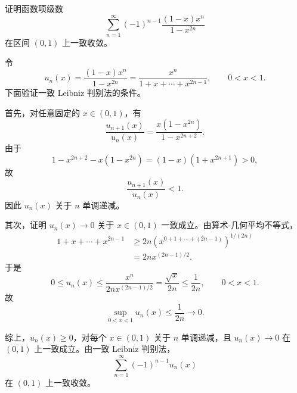 \begin{question}[15分]
证明函数项级数
\[
  \sum_{n=1}^{\infty}(-1)^{n-1}\frac{(1-x)x^n}{1-x^{2n}}
\]
在区间 $(0,1)$ 上一致收敛。
\begin{solution}
令
\[
  u_n(x)=\frac{(1-x)x^n}{1-x^{2n}}
  =\frac{x^n}{1+x+\cdots+x^{2n-1}},
  \qquad 0<x<1.
\]
下面验证一致 Leibniz 判别法的条件。

首先，对任意固定的 $x\in(0,1)$，有
\[
  \frac{u_{n+1}(x)}{u_n(x)}
  =
  \frac{x(1-x^{2n})}{1-x^{2n+2}}.
\]
由于
\[
  1-x^{2n+2}-x(1-x^{2n})
  =(1-x)(1+x^{2n+1})>0,
\]
故
\[
  \frac{u_{n+1}(x)}{u_n(x)}<1.
\]
因此 $u_n(x)$ 关于 $n$ 单调递减。

其次，证明 $u_n(x)\to0$ 关于 $x\in(0,1)$ 一致成立。由算术-几何平均不等式，
\[
\begin{aligned}
  1+x+\cdots+x^{2n-1}
  &\ge
  2n\left(x^{0+1+\cdots+(2n-1)}\right)^{1/(2n)}  \\
  &=2n x^{(2n-1)/2}.
\end{aligned}
\]
于是
\[
  0\le u_n(x)
  \le
  \frac{x^n}{2n x^{(2n-1)/2}}
  =
  \frac{\sqrt{x}}{2n}
  \le \frac1{2n},
  \qquad 0<x<1.
\]
故
\[
  \sup_{0<x<1}u_n(x)\le \frac1{2n}\to0.
\]

综上，$u_n(x)\ge0$，对每个 $x\in(0,1)$ 关于 $n$ 单调递减，且 $u_n(x)\to0$ 在 $(0,1)$ 上一致成立。由一致 Leibniz 判别法，
\[
  \sum_{n=1}^{\infty}(-1)^{n-1}u_n(x)
\]
在 $(0,1)$ 上一致收敛。
\end{solution}
\end{question}

